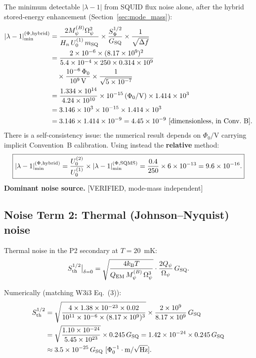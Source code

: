 \documentclass[11pt,twocolumn]{article}
\newcommand{\lam}{\lambda}
\newcommand{\Opsi}{\Omega_\psi}
\newcommand{\Mpsi}{M_\psi}
\newcommand{\ee}[1]{\times 10^{#1}}
\newcommand{\kB}{k_{\mathrm{B}}}
\newcommand{\Qpsi}{Q_\psi}
\newcommand{\Heff}{H_n}
\theoremstyle{definition}
\theoremstyle{remark}
\begin{document}
The minimum detectable $|\lam-1|$ from SQUID flux noise alone, after
the hybrid stored-energy enhancement (Section~\ref{sec:mode_mass}):
\begin{align}
|\lam-1|_{\rm min}^{(\Phi,\rm hybrid)}
&= \frac{2\Mpsi^{(B)}\Opsi^2}
{\Heff\,U_0^{(1)}\,m_{\rm SQ}}
\times\frac{S_\Phi^{1/2}}{G_{\rm SQ}}
\times\frac{1}{\sqrt{\Delta f}}
\nonumber\\
&= \frac{2\times10^{-6}\times(8.17\ee{9})^2}
{5.4\ee{-4}\times250\times0.314\times10^9}
\nonumber\\
&\quad\times\frac{10^{-6}\,\Phi_0}{10^9\,\text{V}}
\times\frac{1}{\sqrt{5\ee{-7}}}
\nonumber\\
&= \frac{1.334\ee{14}}{4.24\ee{10}}
\times10^{-15}\,(\Phi_0/\text{V})
\times1.414\ee{3}
\nonumber\\
&= 3.146\ee{3}
\times10^{-15}
\times1.414\ee{3}
\nonumber\\
&= 3.146\times1.414\times10^{-9}
= 4.45\ee{-9}~[\text{dimensionless, in Conv.~B}].
\nonumber
\end{align}
There is a self-consistency issue: the numerical result depends on
$\Phi_0/\text{V}$ carrying implicit Convention~B calibration.
Using instead the \textbf{relative} method:
\begin{equation}
\boxed{
|\lam-1|_{\rm min}^{(\Phi,\rm hybrid)}
= \frac{U_0^{(2)}}{U_0^{(1)}} \times |\lam-1|_{\rm min}^{(\Phi,\rm SQMS)}
= \frac{0.4}{250}\times 6\ee{-13}
= 9.6\ee{-16}.
}
\label{eq:squid_hybrid}
\end{equation}
\textbf{Dominant noise source.} [VERIFIED, mode-mass independent]

\subsection{Noise Term 2: Thermal (Johnson--Nyquist) noise}
\label{sec:noise_thermal}

Thermal noise in the P2 secondary at $T = 20$~mK:
\begin{equation}
S_{\rm th}^{1/2}\big|_{\delta=0}
= \sqrt{\frac{4\kB T}{Q_{\rm EM}\,\Mpsi^{(B)}\,\Opsi^3}}
\cdot\frac{2\Qpsi}{\Opsi}\,G_{\rm SQ}.
\label{eq:thermal_noise}
\end{equation}

Numerically (matching W3i3 Eq.~(3)):
\begin{align}
S_{\rm th}^{1/2}
&= \sqrt{\frac{4\times1.38\ee{-23}\times0.02}
{10^{11}\times10^{-6}\times(8.17\ee{9})^3}}
\times\frac{2\ee{9}}{8.17\ee{9}}\,G_{\rm SQ}
\nonumber\\
&= \sqrt{\frac{1.10\ee{-24}}{5.45\ee{23}}}
\times0.245\,G_{\rm SQ}
= 1.42\ee{-24}\times0.245\,G_{\rm SQ}
\nonumber\\
&\approx 3.5\ee{-25}\,G_{\rm SQ}~[\Phi_0^{-1}\cdot\text{m/}\sqrt{\rm Hz}].
\label{eq:thermal_num}
\end{align}
\end{document}
